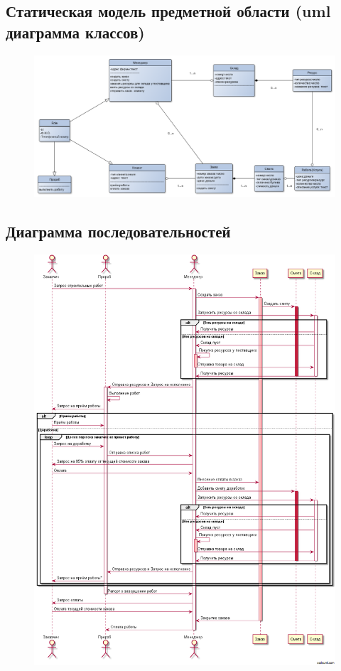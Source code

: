 \documentclass[12pt,a4paper,titlepage]{article}
\begin{document}
\subsection{Статическая модель предметной области (uml диаграмма классов)} 
\begin{figure}[!ht]
\includegraphics[scale=0.3]{images/uml_class_diagram.png}\caption{}
\end{figure}
\newpage
\subsection{Диаграмма последовательностей}
\begin{figure}[!ht]
\includegraphics[scale=0.5]{images/getimage.png}\caption{}
\end{figure}
\newpage
\end{document}
